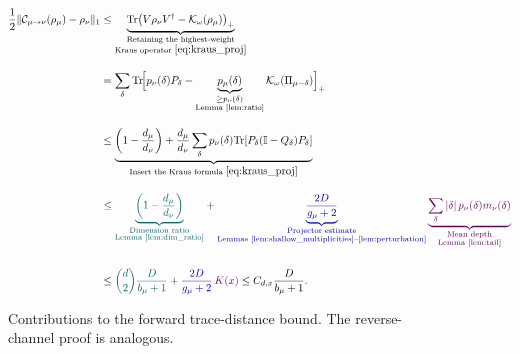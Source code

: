 \documentclass[a4paper,onecolumn,11pt]{quantumarticle}
\def\id{\mathbb{I}}
\newcommand*{\Tr}{\mathrm{Tr}}
\def\C{\mathcal{C}}
\def\map{\mathcal}
\begin{document}
\begin{figure}[!t]
\centering
\begin{minipage}{\linewidth}
\centering\normalsize
\[
\begin{aligned}
\frac12\|\C_{\mu\to\nu}(\rho_\mu)-\rho_\nu\|_1
&\le\underbrace{\Tr\bigl(V\rho_\nu V^\dagger-\map K_\omega(\rho_\mu)\bigr)_+}_{
    \substack{\text{Retaining the highest-weight}\\
    \text{Kraus operator }\eqref{eq:kraus_proj}}}
\\[1em]
&=\sum_\delta\Tr\!\Bigl[
p_\nu(\delta)P_\delta
-\underbrace{p_\mu(\delta)}_{
    \substack{\ge p_\nu(\delta)\\\text{Lemma~\ref{lem:ratio}}}}
\map K_\omega(\Pi_{\mu-\delta})\Bigr]_+
\\[1em]
&\le\underbrace{\left(1-\frac{d_\mu}{d_\nu}\right)
+\frac{d_\mu}{d_\nu}\sum_\delta p_\nu(\delta)
\Tr\!\left[P_\delta(\id-Q_\delta)P_\delta\right]}_{
    \text{Insert the Kraus formula }\eqref{eq:kraus_proj}}
\\[1em]
&\le
{\color{teal!75!black}
\underbrace{\left(1-\frac{d_\mu}{d_\nu}\right)}_{
    \substack{\text{Dimension ratio}\\\text{Lemma~\ref{lem:dim_ratio}}}}}
+{\color{blue!65!black}
\underbrace{\frac{2D}{g_\mu+2}}_{
    \substack{\text{Projector estimate}\\
    \text{Lemmas~\ref{lem:shallow_multiplicities}--\ref{lem:perturbation}}}}}
\,{\color{violet!75!black}
\underbrace{\sum_\delta|\delta|\,p_\nu(\delta)m_\nu(\delta)}_{
    \substack{\text{Mean depth}\\\text{Lemma~\ref{lem:tail}}}}}
\\[1.5em]
&\le {\color{teal!75!black}\binom d2\frac{D}{b_\mu+1}}
+{\color{blue!65!black}\frac{2D}{g_\mu+2}}
\,{\color{violet!75!black}K(x)}
\le C_{d,x}\frac{D}{b_\mu+1}.
\end{aligned}
\]
\end{minipage}
\caption{Contributions to the forward trace-distance bound. The reverse-channel proof is analogous.}
\label{fig:cloning_proof}
\end{figure}
\end{document}
